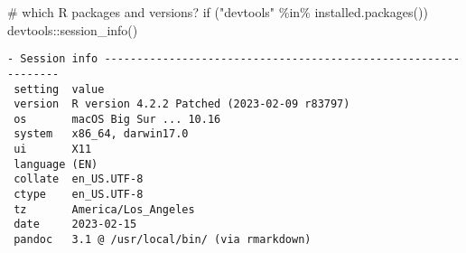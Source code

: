 \documentclass[
  super,
  preprint,
  3p]{elsarticle}
\newenvironment{Shaded}{\begin{snugshade}}{\end{snugshade}}
\newcommand{\CommentTok}[1]{\textcolor[rgb]{0.37,0.37,0.37}{#1}}
\newcommand{\ControlFlowTok}[1]{\textcolor[rgb]{0.00,0.23,0.31}{#1}}
\newcommand{\FunctionTok}[1]{\textcolor[rgb]{0.28,0.35,0.67}{#1}}
\newcommand{\NormalTok}[1]{\textcolor[rgb]{0.00,0.23,0.31}{#1}}
\newcommand{\SpecialCharTok}[1]{\textcolor[rgb]{0.37,0.37,0.37}{#1}}
\newcommand{\StringTok}[1]{\textcolor[rgb]{0.13,0.47,0.30}{#1}}
\begin{document}
\begin{Shaded}
\begin{Highlighting}[]
\CommentTok{\# which R packages and versions?}
\ControlFlowTok{if}\NormalTok{ (}\StringTok{"devtools"} \SpecialCharTok{\%in\%} \FunctionTok{installed.packages}\NormalTok{()) devtools}\SpecialCharTok{::}\FunctionTok{session\_info}\NormalTok{()}
\end{Highlighting}
\end{Shaded}

\begin{verbatim}
- Session info ---------------------------------------------------------------
 setting  value
 version  R version 4.2.2 Patched (2023-02-09 r83797)
 os       macOS Big Sur ... 10.16
 system   x86_64, darwin17.0
 ui       X11
 language (EN)
 collate  en_US.UTF-8
 ctype    en_US.UTF-8
 tz       America/Los_Angeles
 date     2023-02-15
 pandoc   3.1 @ /usr/local/bin/ (via rmarkdown)


\end{verbatim}
\end{document}
